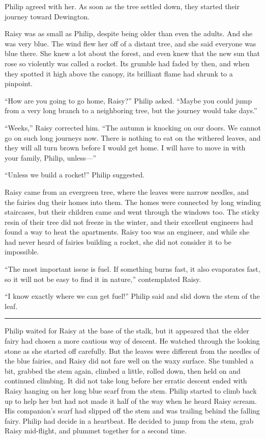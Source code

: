 \documentclass[10pt]{memoir}
\renewcommand{\pfbreakdisplay}{\bigskip \ding{166} \bigskip}
\newcommand{\secbreak}{\fancybreak{\pfbreakdisplay}}
\begin{document}
Philip agreed with her. As soon as the tree settled down, they started their
journey toward Dewington.

Raisy was as small as Philip, despite being older than even the adults. And she
was very blue. The wind flew her off of a distant tree, and she said everyone
was blue there. She knew a lot about the forest, and even knew that the new sun
that rose so violently was called a rocket. Its grumble had faded by then, and
when they spotted it high above the canopy, its brilliant flame had shrunk to a
pinpoint.

``How are you going to go home, Raisy?'' Philip asked. ``Maybe you could jump
from a very long branch to a neighboring tree, but the journey would take
days.''

``Weeks,'' Raisy corrected him. ``The autumn is knocking on our doors. We
cannot go on such long journeys now. There is nothing to eat on the withered
leaves, and they will all turn brown before I would get home. I will have to
move in with your family, Philip, unless---''

``Unless we build a rocket!'' Philip suggested.

Raisy came from an evergreen tree, where the leaves were narrow needles, and
the fairies dug their homes into them. The homes were connected by long winding
staircases, but their children came and went through the windows too. The
sticky resin of their tree did not freeze in the winter, and their excellent
engineers had found a way to heat the apartments. Raisy too was an engineer,
and while she had never heard of fairies building a rocket, she did not
consider it to be impossible.

``The most important issue is fuel. If something burns fast, it also evaporates
fast, so it will not be easy to find it in nature,'' contemplated Raisy.

``I know exactly where we can get fuel!'' Philip said and slid down the stem of
the leaf.

\secbreak

Philip waited for Raisy at the base of the stalk, but it appeared that the
elder fairy had chosen a more cautious way of descent. He watched through the
looking stone as she started off carefully. But the leaves were different from
the needles of the blue fairies, and Raisy did not fare well on the waxy
surface. She tumbled a bit, grabbed the stem again, climbed a little, rolled
down, then held on and continued climbing. It did not take long before her
erratic descent ended with Raisy hanging on her long blue scarf from the stem.
Philip started to climb back up to help her but had not made it half of the way
when he heard Raisy scream. His companion's scarf had slipped off the stem and
was trailing behind the falling fairy. Philip had decide in a heartbeat. He
decided to jump from the stem, grab Raisy mid-flight, and plummet together for
a second time.
\end{document}
